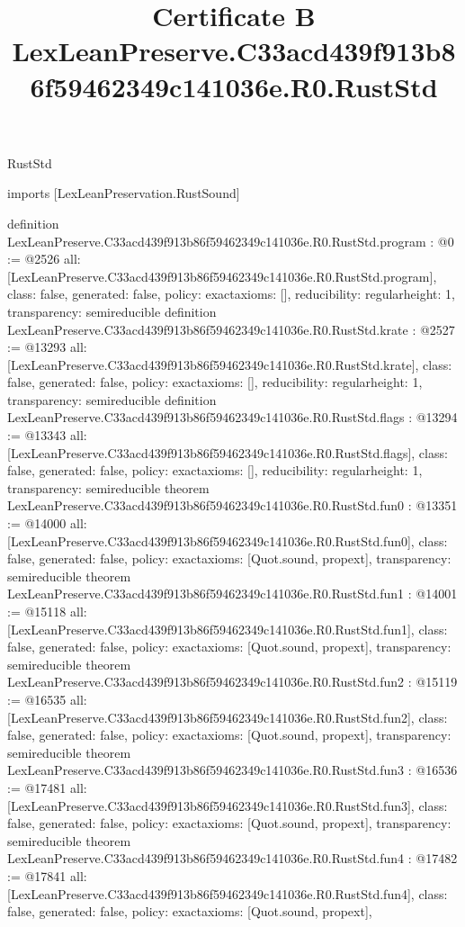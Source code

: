 \begin{lexlean}{RustStd}
\title{Certificate B LexLeanPreserve.C33acd439f913b86f59462349c141036e.R0.RustStd}
\begin{coremodule}
imports [LexLeanPreservation.RustSound]

definition LexLeanPreserve.C33acd439f913b86f59462349c141036e.R0.RustStd.program : @0 := @2526 {
  all: [LexLeanPreserve.C33acd439f913b86f59462349c141036e.R0.RustStd.program],
  class: false,
  generated: false,
  policy: exact{axioms: []},
  reducibility: regular{height: 1},
  transparency: semireducible
}
definition LexLeanPreserve.C33acd439f913b86f59462349c141036e.R0.RustStd.krate : @2527 := @13293 {
  all: [LexLeanPreserve.C33acd439f913b86f59462349c141036e.R0.RustStd.krate],
  class: false,
  generated: false,
  policy: exact{axioms: []},
  reducibility: regular{height: 1},
  transparency: semireducible
}
definition LexLeanPreserve.C33acd439f913b86f59462349c141036e.R0.RustStd.flags : @13294 := @13343 {
  all: [LexLeanPreserve.C33acd439f913b86f59462349c141036e.R0.RustStd.flags],
  class: false,
  generated: false,
  policy: exact{axioms: []},
  reducibility: regular{height: 1},
  transparency: semireducible
}
theorem LexLeanPreserve.C33acd439f913b86f59462349c141036e.R0.RustStd.fun0 : @13351 := @14000 {
  all: [LexLeanPreserve.C33acd439f913b86f59462349c141036e.R0.RustStd.fun0],
  class: false,
  generated: false,
  policy: exact{axioms: [Quot.sound, propext]},
  transparency: semireducible
}
theorem LexLeanPreserve.C33acd439f913b86f59462349c141036e.R0.RustStd.fun1 : @14001 := @15118 {
  all: [LexLeanPreserve.C33acd439f913b86f59462349c141036e.R0.RustStd.fun1],
  class: false,
  generated: false,
  policy: exact{axioms: [Quot.sound, propext]},
  transparency: semireducible
}
theorem LexLeanPreserve.C33acd439f913b86f59462349c141036e.R0.RustStd.fun2 : @15119 := @16535 {
  all: [LexLeanPreserve.C33acd439f913b86f59462349c141036e.R0.RustStd.fun2],
  class: false,
  generated: false,
  policy: exact{axioms: [Quot.sound, propext]},
  transparency: semireducible
}
theorem LexLeanPreserve.C33acd439f913b86f59462349c141036e.R0.RustStd.fun3 : @16536 := @17481 {
  all: [LexLeanPreserve.C33acd439f913b86f59462349c141036e.R0.RustStd.fun3],
  class: false,
  generated: false,
  policy: exact{axioms: [Quot.sound, propext]},
  transparency: semireducible
}
theorem LexLeanPreserve.C33acd439f913b86f59462349c141036e.R0.RustStd.fun4 : @17482 := @17841 {
  all: [LexLeanPreserve.C33acd439f913b86f59462349c141036e.R0.RustStd.fun4],
  class: false,
  generated: false,
  policy: exact{axioms: [Quot.sound, propext]},
}
\end{coremodule}
\end{lexlean}

